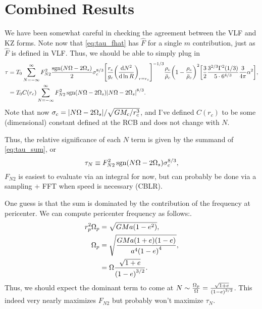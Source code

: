 \documentclass[11pt,
        usenames, %
        dvipsnames %
    ]{article}
\newcommand*{\rd}[2]{\frac{\mathrm{d}#1}{\mathrm{d}#2}}
\DeclareMathOperator{\sgn}{sgn}
\DeclarePairedDelimiter\abs{\lvert}{\rvert}
\DeclarePairedDelimiter\p{\lparen}{\rparen}
\DeclarePairedDelimiter\s{\lbrack}{\rbrack}
\begin{document}
\section{Combined Results}

We have been somewhat careful in checking the agreement between the VLF and KZ
forms. Note now that \autoref{eq:tau_fhat} has $\hat{F}$ for a single $m$
contribution, just as $\hat{F}$ is defined in VLF\@. Thus, we should be able to
simply plug in
\begin{align}
    \tau &= T_0 \sum\limits_{N = -\infty}^\infty
        F_{N2}^2 \frac{\sgn\p*{N\Omega - 2\Omega_s}}{2} \sigma_c^{8/3}
        \s*{\frac{r_c}{g_c}\p*{\rd{N^2}{\ln R}}_{r = r_c}}^{-1/3}
            \frac{\rho_c}{\bar{\rho}_c} \p*{1 - \frac{\rho_c}{\bar{\rho}_c}}^2
            \s*{\frac{3}{2}\frac{3^{2/3}\Gamma^2(1/3)}{5 \cdot
                6^{4/3}} \frac{3}{4\pi}\alpha^2},\\
        &= T_0 C(r_c) \sum\limits_{N = -\infty}^\infty
            F_{N2}^2 \sgn\p*{N\Omega - 2\Omega_s}
                \abs*{N\Omega - 2\Omega_s}^{8/3}.\label{eq:tau_sum}
\end{align}
Note that now $\sigma_c = \abs*{N\Omega - 2\Omega_s} / \sqrt{GM_c / r_c^3}$, and
I've defined $C(r_c)$ to be some (dimensional) constant defined at the RCB and
does not change with $N$.

Thus, the relative significance of each $N$ term is given by the summand of
\autoref{eq:tau_sum}, or
\begin{equation}
    \tau_N \equiv F_{N2}^2 \sgn\p*{N\Omega - 2\Omega_s} \sigma_c^{8/3},
\end{equation}
$F_{N2}$ is easiest to evaluate via an integral for now, but can probably be
done via a sampling + FFT when speed is necessary (CBLR).

One guess is that the sum is dominated by the contribution of the frequency at
pericenter. We can compute pericenter frequency as follows:.
\begin{align}
    r_p^2 \Omega_p &= \sqrt{GMa\p*{1 - e^2}},\\
    \Omega_p &= \sqrt{\frac{GMa\p*{1 + e}\p*{1 - e}}{a^4\p*{1 - e}^4}},\\
        &= \Omega \frac{\sqrt{1 + e}}{\p*{1 - e}^{3/2}}.
\end{align}
Thus, we should expect the dominant term to come at $N \sim
\frac{\Omega_p}{\Omega} = \frac{\sqrt{1 + e}}{\p*{1 - e}^{3/2}}$. This indeed
very nearly maximizes $F_{N2}$ but probably won't maximize $\tau_N$.
\end{document}
